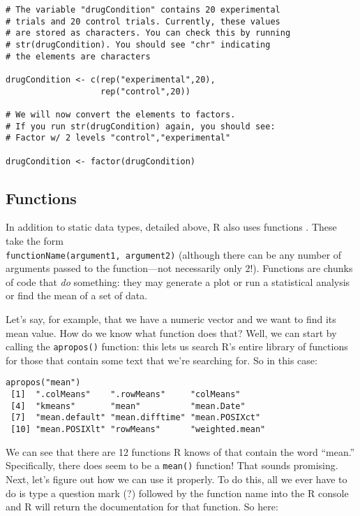 \begin{framed}
\begin{Verbatim}[samepage=TRUE]
# The variable "drugCondition" contains 20 experimental
# trials and 20 control trials. Currently, these values
# are stored as characters. You can check this by running
# str(drugCondition). You should see "chr" indicating
# the elements are characters
 
drugCondition <- c(rep("experimental",20),
                   rep("control",20))
 
# We will now convert the elements to factors.
# If you run str(drugCondition) again, you should see:
# Factor w/ 2 levels "control","experimental"
 
drugCondition <- factor(drugCondition)
\end{Verbatim}
\end{framed}

\subsection{Functions}
In addition to static data types, detailed above, R also uses functions . These take the form \\\verb|functionName(argument1, argument2)| (although there can be any number of arguments passed to the function---not necessarily only 2!). Functions are chunks of code that \textit{do} something: they may generate a plot or run a statistical analysis or find the mean of a set of data.

Let's say, for example, that we have a numeric vector and we want to find its mean value. How do we know what function does that? Well, we can start by calling the \verb|apropos()| function: this lets us search R's entire library of functions for those that contain some text that we're searching for. So in this case:

\begin{framed}
\begin{Verbatim}[samepage=TRUE]
apropos("mean")
 [1]  ".colMeans"    ".rowMeans"     "colMeans"
 [4]  "kmeans"       "mean"          "mean.Date"
 [7]  "mean.default" "mean.difftime" "mean.POSIXct"
 [10] "mean.POSIXlt" "rowMeans"      "weighted.mean"
\end{Verbatim}
\end{framed}

We can see that there are 12 functions R knows of that contain the word ``mean.'' Specifically, there does seem to be a \verb|mean()| function! That sounds promising. Next, let's figure out how we can use it properly. To do this, all we ever have to do is type a question mark (?) followed by the function name into the R console and R will return the documentation for that function. So here:

